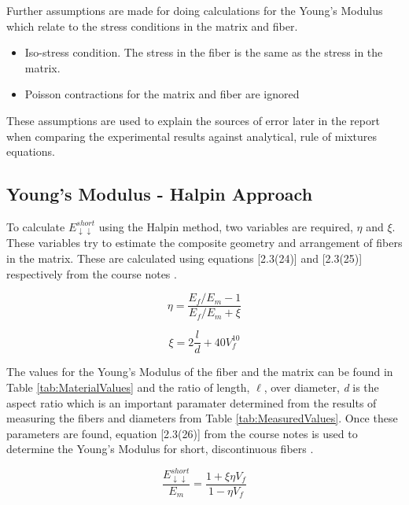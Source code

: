 \documentclass[11pt]{article}
\begin{document}
Further assumptions are made for doing calculations for the Young's Modulus which relate to the stress conditions in the matrix and fiber.

\begin{itemize}
\item Iso-stress condition. The stress in the fiber is the same as the stress in the matrix.
\item Poisson contractions for the matrix and fiber are ignored
\end{itemize}

These assumptions are used to explain the sources of error later in the report when comparing the experimental results against analytical, rule of mixtures equations.


\subsection{Young's Modulus - Halpin Approach}

To calculate \(E_{\downarrow \downarrow}^{short}\) using the Halpin method, two variables are required, \(\eta\) and \(\xi\). These variables try to estimate the composite geometry and arrangement of fibers in the matrix. These are calculated using equations [2.3(24)] and [2.3(25)] respectively from the course notes \cite{course_notes}.

\begin{equation}
\eta = \frac{E_f/E_m-1}{E_f/E_m+\xi}
\end{equation}

\begin{equation}
\xi = 2 \frac{l}{d} +40V^{10}_f
\end{equation}

The values for the Young's Modulus of the fiber and the matrix can be found in Table \ref{tab:MaterialValues} and the ratio of  length, \(\ell\), over diameter, \textit{d} is the aspect ratio which is an important paramater determined from the results of measuring the fibers and diameters from Table \ref{tab:MeasuredValues}. Once these parameters are found, equation [2.3(26)] from the course notes is used to determine the Young's Modulus for short, discontinuous fibers \cite{course_notes}.

\begin{equation} \label{eq:halpin}
\frac{E^{short}_{\downarrow \downarrow}}{E_m} = \frac{1+\xi \eta V_f}{1-\eta V_f}
\end{equation}
\end{document}
